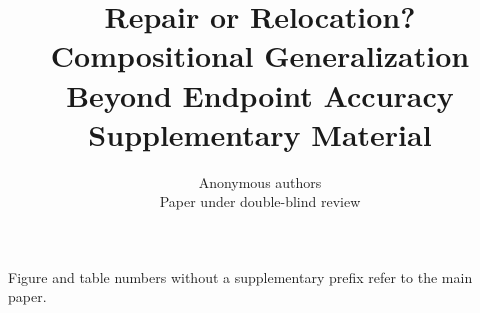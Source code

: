 \documentclass{article}
\title{Repair or Relocation? Compositional Generalization Beyond Endpoint Accuracy\\Supplementary Material}
\author{Anonymous authors\\Paper under double-blind review}
\begin{document}
\maketitle
\noindent Figure and table numbers without a supplementary prefix refer to the main paper.
\appendix

\end{document}
